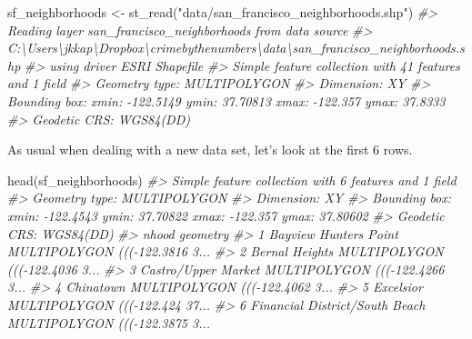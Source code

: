 \documentclass[
]{krantz}
\makeatletter
\newenvironment{Shaded}{\begin{snugshade}}{\end{snugshade}}
\newcommand{\CommentTok}[1]{\textcolor[rgb]{0.37,0.37,0.37}{\textit{#1}}}
\newcommand{\FunctionTok}[1]{\textcolor[rgb]{0,0,0}{#1}}
\newcommand{\NormalTok}[1]{#1}
\newcommand{\OtherTok}[1]{\textcolor[rgb]{0.37,0.37,0.37}{#1}}
\newcommand{\StringTok}[1]{\textcolor[rgb]{0.5,0.5,0.5}{#1}}
\newenvironment{kframe}{%
\medskip{}
\setlength{\fboxsep}{.8em}
 \def\at@end@of@kframe{}%
 \ifinner\ifhmode%
  \def\at@end@of@kframe{\end{minipage}}%
  \begin{minipage}{\columnwidth}%
 \fi\fi%
 \def\FrameCommand##1{\hskip\@totalleftmargin \hskip-\fboxsep
 \colorbox{shadecolor}{##1}\hskip-\fboxsep
     \hskip-\linewidth \hskip-\@totalleftmargin \hskip\columnwidth}%
 \MakeFramed {\advance\hsize-\width
   \@totalleftmargin\z@ \linewidth\hsize
   \@setminipage}}%
 {\par\unskip\endMakeFramed%
 \at@end@of@kframe}
\renewenvironment{Shaded}{\begin{kframe}}{\end{kframe}}
\makeatother
\begin{document}
\begin{Shaded}
\begin{Highlighting}[]
\NormalTok{sf\_neighborhoods }\OtherTok{\textless{}{-}} \FunctionTok{st\_read}\NormalTok{(}\StringTok{"data/san\_francisco\_neighborhoods.shp"}\NormalTok{)}
\CommentTok{\#\textgreater{} Reading layer \textasciigrave{}san\_francisco\_neighborhoods\textquotesingle{} from data source }
\CommentTok{\#\textgreater{}   \textasciigrave{}C:\textbackslash{}Users\textbackslash{}jkkap\textbackslash{}Dropbox\textbackslash{}crimebythenumbers\textbackslash{}data\textbackslash{}san\_francisco\_neighborhoods.shp\textquotesingle{} }
\CommentTok{\#\textgreater{}   using driver \textasciigrave{}ESRI Shapefile\textquotesingle{}}
\CommentTok{\#\textgreater{} Simple feature collection with 41 features and 1 field}
\CommentTok{\#\textgreater{} Geometry type: MULTIPOLYGON}
\CommentTok{\#\textgreater{} Dimension:     XY}
\CommentTok{\#\textgreater{} Bounding box:  xmin: {-}122.5149 ymin: 37.70813 xmax: {-}122.357 ymax: 37.8333}
\CommentTok{\#\textgreater{} Geodetic CRS:  WGS84(DD)}
\end{Highlighting}
\end{Shaded}

As usual when dealing with a new data set, let's look at the first 6 rows.

\begin{Shaded}
\begin{Highlighting}[]
\FunctionTok{head}\NormalTok{(sf\_neighborhoods)}
\CommentTok{\#\textgreater{} Simple feature collection with 6 features and 1 field}
\CommentTok{\#\textgreater{} Geometry type: MULTIPOLYGON}
\CommentTok{\#\textgreater{} Dimension:     XY}
\CommentTok{\#\textgreater{} Bounding box:  xmin: {-}122.4543 ymin: 37.70822 xmax: {-}122.357 ymax: 37.80602}
\CommentTok{\#\textgreater{} Geodetic CRS:  WGS84(DD)}
\CommentTok{\#\textgreater{}                            nhood                       geometry}
\CommentTok{\#\textgreater{} 1          Bayview Hunters Point MULTIPOLYGON ((({-}122.3816 3...}
\CommentTok{\#\textgreater{} 2                 Bernal Heights MULTIPOLYGON ((({-}122.4036 3...}
\CommentTok{\#\textgreater{} 3            Castro/Upper Market MULTIPOLYGON ((({-}122.4266 3...}
\CommentTok{\#\textgreater{} 4                      Chinatown MULTIPOLYGON ((({-}122.4062 3...}
\CommentTok{\#\textgreater{} 5                      Excelsior MULTIPOLYGON ((({-}122.424 37...}
\CommentTok{\#\textgreater{} 6 Financial District/South Beach MULTIPOLYGON ((({-}122.3875 3...}
\end{Highlighting}
\end{Shaded}
\end{document}
